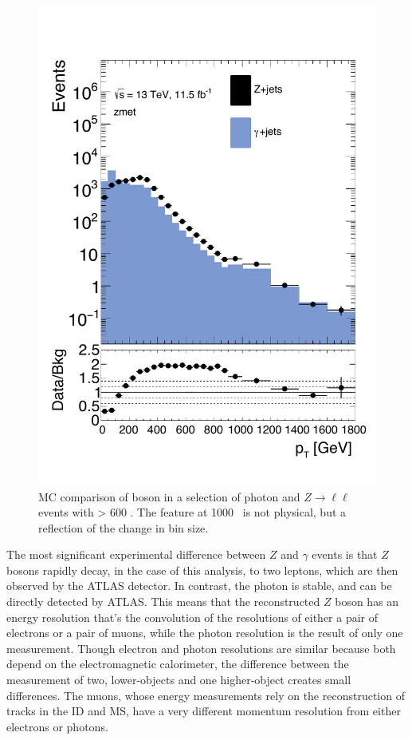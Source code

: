 \begin{centering}
\begin{figure}[!hbt]
\myfloatalign
\includegraphics[width=.85\linewidth]{figures/photons/MC_hist_pt_0_SF_2j_2016_mcmetl___zmet_.pdf}
\caption{\ac{MC} comparison of boson \pt in a selection of photon and $Z\rightarrow\ell\ell$ events with \HT > 600 \gev. The feature at 1000 \gev~is not physical, but a reflection of the change in bin size. }
\label{fig:photon_ptdist}
\end{figure}
\end{centering}

The most significant experimental difference between $Z$ and $\gamma$ events is that $Z$ bosons rapidly decay, in the case of this analysis, to two leptons, which are then observed by the \ac{ATLAS} detector. In contrast, the photon is stable, and can be directly detected by \ac{ATLAS}. This means that the reconstructed $Z$ boson has an energy resolution that's the convolution of the resolutions of either a pair of electrons or a pair of muons, while the photon resolution is the result of only one measurement. Though electron and photon resolutions are similar because both depend on the electromagnetic calorimeter, the difference between the measurement of two, lower-\pt objects and one higher-\pt object creates small differences. The muons, whose energy measurements rely on the reconstruction of tracks in the \ac{ID} and \ac{MS}, have a very different momentum resolution from either electrons or photons. 

